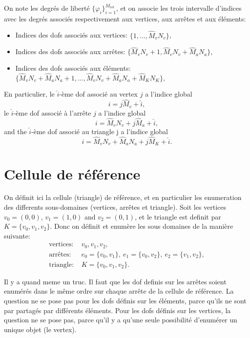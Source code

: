 On note les degrés de liberté $\{\varphi_i\}_{i=1}^{M_\text{tot}}$,
et on associe les trois intervalle d'indices avec les degrés
associés respectivement aux vertices, aux arrêtes et aux
éléments:

\begin{itemize}
\item Indices des dofs associés aux vertices: $\{1, \dots, \hat M_v
  N_v\}$,
\item Indices des dofs associés aux arrêtes: $\{\hat M_v N_v + 1,
  \hat M_v N_v + \hat M_a N_a\}$,
\item Indices des dofs associés aux éléments: $\{\hat M_v N_v + \hat
  M_a N_a + 1, \dots, \hat M_v N_v + \hat M_a N_a + \hat M_K N_K\}$,
\end{itemize}

En particulier, le $\hat i$-ème dof associé au vertex $j$ a l'indice global
\begin{equation}
  i = j \hat M_v + \hat i,
\end{equation}
le $\hat i$-ème dof associé à l'arrête $j$ a l'indice global
\begin{equation}
  i = \hat M_v N_v + j \hat M_a + \hat i,
\end{equation}
and the $\hat i$-ème dof associé au triangle j a l'indice global
\begin{equation}
  i = \hat M_v N_v + \hat M_a N_a + j \hat M_K + \hat i.
\end{equation}

\section{Cellule de référence}
On définit ici la cellule (triangle) de référence, et en
particulier les enumeration des differents sous-domaines (vertices,
arrêtes et triangle). Soit les vertices $v_0 = (0,0)$, $v_1 =
(1,0)$ and $v_2 = (0,1)$, et le triangle est definit par $K = \{v_0,
v_1, v_2\}$. Donc on définit et enumère les sous domaines de la
manière suivante:
\begin{align*}
  \text{vertices: } & v_0, v_1, v_2,\\
  \text{arrêtes: } & e_0 = \{v_0, v_1\},\ e_1 = \{v_0, v_2\},\ e_2 =
  \{v_1, v_2\}, \\
  \text{triangle: } & K = \{v_0, v_1, v_2\}.
\end{align*}

Il y a quand meme un truc. Il faut que les dof definis sur les
arrêtes soient enumérés dans le même ordre sur chaque arrête de
la cellule de référence. La question ne se pose pas pour les dofs
définis sur les éléments, parce qu'ils ne sont par partagés par
différents éléments. Pour les dofs définis sur les vertices, la
question ne se pose pas, parce qu'il y a qu'une seule possibilité
d'enumérer un unique objet (le vertex).


